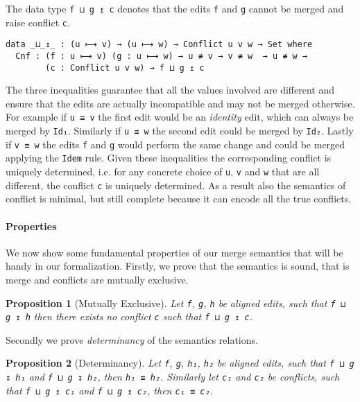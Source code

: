 \documentclass{sigplanconf}
\theoremstyle{plain}
\newtheorem{prop}{Proposition}
\begin{document}
	The data type \texttt{f ⊔ g ↥ c} denotes that the edits
        \texttt{f} and \texttt{g} cannot be merged and raise conflict
        \texttt{c}.

\begin{verbatim}
data _⊔_↥_ : (u ⟼ v) → (u ⟼ w) → Conflict u v w → Set where
  Cnf : (f : u ⟼ v) (g : u ⟼ w) → u ≢ v → v ≢ w  → u ≢ w → 
        (c : Conflict u v w) → f ⊔ g ↥ c
\end{verbatim}

	The three inequalities guarantee that all the values involved are different
        and ensure that the edits are actually incompatible and may not be merged 
        otherwise. For example if \texttt{u ≡ v} the first edit would be an
        \emph{identity} edit, which can always be merged by
        \texttt{Id₁}. Similarly if \texttt{u ≡ w} the second edit could be merged
        by \texttt{Id₂}. Lastly if \texttt{v ≡ w} the edits \texttt{f} and \texttt{g}
        would perform the same change and could be merged applying the \texttt{Idem}
        rule.
        Given these inequalities the corresponding conflict is uniquely determined,
        i.e. for any concrete choice of \texttt{u}, \texttt{v} and \texttt{w} that
        are all different, the conflict \texttt{c} is uniquely determined.
	As a result also the semantics of conflict is minimal, but still complete
        because it can encode all the true conflicts.

        \paragraph{Properties}
        We now show some fundamental properties of our merge semantics that
        will be handy in our formalization.
        Firstly, we prove that the semantics is sound, that is
        merge and conflicts are mutually exclusive.
        \begin{prop}[Mutually Exclusive]
          \label{prop:mutually-exclusive}
          Let \texttt{f}, \texttt{g}, \texttt{h} be aligned edits, such that
          \texttt{f ⊔ g ↧ h} then there exists no conflict \texttt{c} such that
          \texttt{f ⊔ g ↥ c}.
        \end{prop}
        Secondly we prove \emph{determinancy} of the semantics relations.
        \begin{prop}[Determinancy]
          \label{prop:determinancy}
        Let \texttt{f}, \texttt{g}, \texttt{h₁}, \texttt{h₂} be
        aligned edits, such that \texttt{f ⊔ g ↧ h₁} and \texttt{f ⊔ g
          ↧ h₂}, then \texttt{h₁ ≡ h₂}.
        Similarly let \texttt{c₁} and \texttt{c₂} be conflicts, such
        that \texttt{f ⊔ g ↥ c₁} and \texttt{f ⊔ g ↥ c₂}, then
        \texttt{c₁ ≡ c₂}.
        \end{prop}
\end{document}
